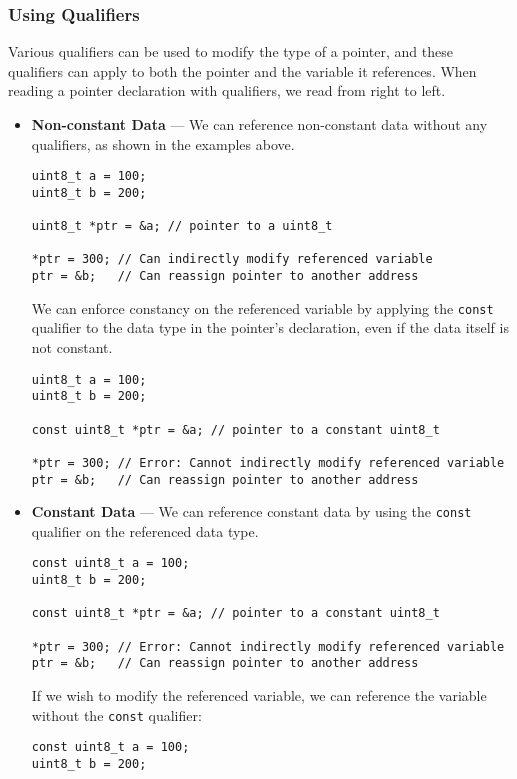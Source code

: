 \documentclass{article}
\begin{document}
\subsubsection{Using Qualifiers}
Various qualifiers can be used to modify the type of a pointer, and
these qualifiers can apply to both the pointer and the variable it
references. When reading a pointer declaration with qualifiers, we read
from right to left.
\begin{itemize}
    \item \textbf{Non-constant Data} --- We can reference non-constant
          data without any qualifiers, as shown in the examples above.
          \begin{verbatim}
uint8_t a = 100;
uint8_t b = 200;

uint8_t *ptr = &a; // pointer to a uint8_t

*ptr = 300; // Can indirectly modify referenced variable
ptr = &b;   // Can reassign pointer to another address
\end{verbatim}
          We can enforce constancy on the referenced variable by
          applying the \texttt{const} qualifier to the data type
          in the pointer's declaration, even if the data itself is not
          constant.
          \begin{verbatim}
uint8_t a = 100;
uint8_t b = 200;

const uint8_t *ptr = &a; // pointer to a constant uint8_t

*ptr = 300; // Error: Cannot indirectly modify referenced variable
ptr = &b;   // Can reassign pointer to another address
\end{verbatim}
    \item \textbf{Constant Data} --- We can reference constant data
          by using the \texttt{const} qualifier on the referenced
          data type.
          \begin{verbatim}
const uint8_t a = 100;
uint8_t b = 200;

const uint8_t *ptr = &a; // pointer to a constant uint8_t

*ptr = 300; // Error: Cannot indirectly modify referenced variable
ptr = &b;   // Can reassign pointer to another address
\end{verbatim}
          If we wish to modify the referenced variable, we can
          reference the variable without the \texttt{const}
          qualifier:
          \begin{verbatim}
const uint8_t a = 100;
uint8_t b = 200;


\end{verbatim}
\end{itemize}
\end{document}
